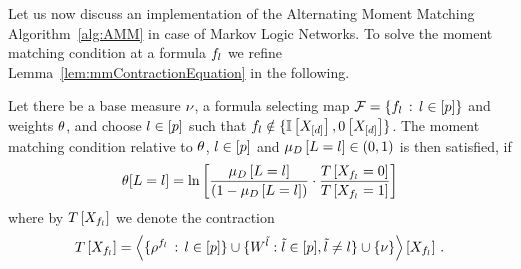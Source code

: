 

Let us now discuss an implementation of the Alternating Moment Matching Algorithm~\ref{alg:AMM} in case of Markov Logic Networks.
To solve the moment matching condition at a formula $f_{l}$ we refine Lemma~\ref{lem:mmContractionEquation} in the following.


\begin{lemma}\label{ref:lemMMinMLN}
	Let there be a base measure $\nu$, a formula selecting map $\mathcal{F}=\{f_{l} \, : \, l\in[p]\}$ and weights $\theta$, and choose $l\in[p]$ such that $f_{l}  \notin \{\mathbb{I}\left[X_{[d]}\right],0\left[X_{[d]}\right]\}$.	
	The moment matching condition relative to $\theta$, $l\in[p]$ and $\mu_{D}\left[L=l\right]\in(0,1)$ is then satisfied, if
	\begin{align*}
	 	\theta[L=l] = \ln \left[ 
		\frac{\mu_{D}\left[L=l\right]}{(1-\mu_{D}\left[L=l\right])} 
		\cdot \frac{T\left[X_{f_{l} }=0\right]}{T\left[X_{f_{l} }=1\right]} 
		 \right] 
	\end{align*}
	where by $T\left[X_{f_{l} }\right]$ we denote the contraction 
	\begin{align*}
	 	T\left[X_{f_{l}}\right] 
		= \left\langle \{\rho^{f_{l}} \, : \, l\in[p]\}
		\cup\{W^{\tilde{l}} : \tilde{l} \in [p], \tilde{l}\neq l\}
		\cup\{\nu\}\right\rangle \left[ X_{f_{l}} \right] \, . 
	\end{align*}
\end{lemma}
